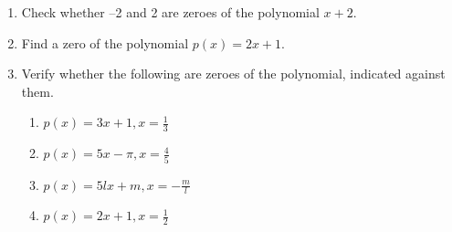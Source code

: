 \renewcommand{\theequation}{\theenumi}
\begin{enumerate}[label=\arabic*.,ref=\thesubsection.\theenumi]
%
\item Check whether –2 and 2 are zeroes of the polynomial $x + 2.$
\item Find a zero of the polynomial $p(x) = 2x + 1$.
 \item Verify whether the following are zeroes of the polynomial, indicated against them. 
\begin{enumerate}

\item $ p(x) = 3x + 1, x = \frac{1}{3}$
\item $ p(x) = 5x -\pi, x = \frac{4}{5}$
\item $ p(x) = 5lx+m, x = -\frac{m}{l}$
\item $ p(x) = 2x+1, x = \frac{1}{2}$

\end{enumerate}


\end{enumerate}
